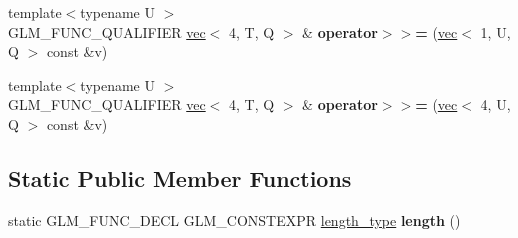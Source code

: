 \begin{DoxyCompactItemize}
\item 
\mbox{\label{structglm_1_1vec_3_014_00_01T_00_01Q_01_4_a83a91fd4b81cc0335d4310a2aed2f713}} 
{\footnotesize template$<$typename U $>$ }\\G\+L\+M\+\_\+\+F\+U\+N\+C\+\_\+\+Q\+U\+A\+L\+I\+F\+I\+ER \hyperlink{structglm_1_1vec}{vec}$<$ 4, T, Q $>$ \& {\bfseries operator$>$$>$=} (\hyperlink{structglm_1_1vec}{vec}$<$ 1, U, Q $>$ const \&v)
\item 
\mbox{\label{structglm_1_1vec_3_014_00_01T_00_01Q_01_4_a44ce6a7a24c6f0b24eee2c09ae28796b}} 
{\footnotesize template$<$typename U $>$ }\\G\+L\+M\+\_\+\+F\+U\+N\+C\+\_\+\+Q\+U\+A\+L\+I\+F\+I\+ER \hyperlink{structglm_1_1vec}{vec}$<$ 4, T, Q $>$ \& {\bfseries operator$>$$>$=} (\hyperlink{structglm_1_1vec}{vec}$<$ 4, U, Q $>$ const \&v)
\end{DoxyCompactItemize}
\subsection*{Static Public Member Functions}
\begin{DoxyCompactItemize}
\item 
\mbox{\label{structglm_1_1vec_3_014_00_01T_00_01Q_01_4_ac83fdb652378185c944b11f5cf35744d}} 
static G\+L\+M\+\_\+\+F\+U\+N\+C\+\_\+\+D\+E\+CL G\+L\+M\+\_\+\+C\+O\+N\+S\+T\+E\+X\+PR \hyperlink{structglm_1_1vec_3_014_00_01T_00_01Q_01_4_af1c8f56963141951f4a4724b47e072d9}{length\+\_\+type} {\bfseries length} ()
\end{DoxyCompactItemize}
